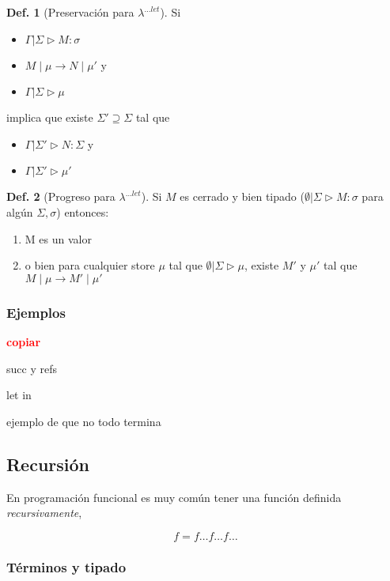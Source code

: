 \documentclass{report}
\theoremstyle{definition} %
\newtheorem{definition}{Def.}[chapter]
\newcommand{\todo}[1]{{\textcolor{red}{\textbf{#1}}}}
\newcommand{\tipa}[3]{#1 \rhd #2 : #3} %
\newcommand{\GStipa}[2]{\tipa{\Gamma|\Sigma}{#1}{#2}}
\newcommand{\compat}[2]{#1 \rhd #2} %
\newcommand{\GSCompat}[1]{\compat{\Gamma|\Sigma}{#1}} %
\newcommand{\lambdalet}{\lambda^{\dots let}}
\newcommand{\sreduce}[4]{\reduce{#1\mid#2}{#3\mid#4}}
\newcommand{\sreduceToPrime}[2]{\sreduce{#1}{#2}{#1'}{#2'}}
\newcommand{\reduce}[2]{#1 \to #2}
\begin{document}
\begin{definition}[Preservación para $\lambdalet$]
    Si
    \begin{itemize}
        \item $\GStipa{M}{\sigma}$
        \item $\sreduce{M}{\mu}{N}{\mu'}$ y
        \item $\GSCompat{\mu}$
    \end{itemize}
    
    implica que existe $\Sigma' \supseteq \Sigma$ tal que
    \begin{itemize}
        \item $\tipa{\Gamma|\Sigma'}{N}{\Sigma}$ y
        \item $\compat{\Gamma|\Sigma'}{\mu'}$
    \end{itemize}
\end{definition}

\begin{definition}[Progreso para $\lambdalet$]
    Si $M$ es cerrado y bien tipado ($\tipa{\emptyset|\Sigma}{M}{\sigma}$ para
    algún $\Sigma, \sigma$) entonces:

    \begin{enumerate}
        \item M es un valor
        \item o bien para cualquier store $\mu$ tal que
        $\compat{\emptyset|\Sigma}{\mu}$, existe $M'$ y $\mu'$ tal que $\sreduceToPrime{M}{\mu}$
    \end{enumerate}
\end{definition}

\subsubsection{Ejemplos}

\todo{copiar}

succ y refs

let in

ejemplo de que no todo termina

\subsection{Recursión}

En programación funcional es muy común tener una función definida
\textit{recursivamente},

$$f = f \dots f \dots f \dots$$

\subsubsection{Términos y tipado}
\end{document}
